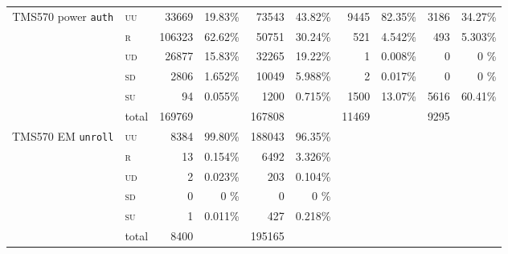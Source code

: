 \documentclass[10pt]{article}
\newcommand{\TI}{TMS570\xspace}
\newcommand{\unroll}{\texttt{unroll}\xspace}
\newcommand{\auth}{\texttt{auth}\xspace}
\newcommand{\UU}{\textsc{uu}\xspace}
\newcommand{\UD}{\textsc{ud}\xspace}
\newcommand{\SU}{\textsc{su}\xspace}
\newcommand{\SD}{\textsc{sd}\xspace}
\newcommand{\R}{\textsc{r}\xspace}
\begin{document}
\begin{table}[H]
\begin{tabular}{ll rr rr rr rr}
    \multicolumn{1}{c}{\multirow{3}{*}{ \parbox{2cm}{\TI power \auth}}}
    & \UU    
    & 33669   & 19.83\%                     
    &  73543  & 43.82\%                 
    &  9445  & 82.35\%                 
    &  3186  & 34.27\%                      
    \\
    & \R   
    & 106323  & 62.62\%                     
    &  50751  & 30.24\%                 
    &  521   & 4.542\%                 
    &  493   & 5.303\%                      
    \\
    & \UD  
    & 26877   & 15.83\%                     
    &  32265  & 19.22\%                 
    &  1     & 0.008\%                 
    &  0     & 0    \%                      
    \\
    & \SD     
    & 2806    & 1.652\%                     
    &  10049  & 5.988\%                 
    &  2     & 0.017\%                 
    &  0     & 0    \%                      
    \\
    & \SU      
    & 94      & 0.055\%                     
    &  1200   & 0.715\%                 
    &  1500  & 13.07\%                 
    &  5616  & 60.41\%                      
    \\

    \cmidrule(l){2-10}
    & total    
    & 169769  &                           
    &  167808 &                       
    &  11469 &                       
    & 9295  &                                 
    \\

    \midrule

    \multicolumn{1}{c}{\multirow{3}{*}{ \parbox{2cm}{\TI EM \unroll}}}

    & \UU    
    & 8384   & 99.80\%                   
    &  188043 & 96.35\%    
    & & 
    & &
    \\
    & \R   
    & 13     & 0.154\%                   
    &  6492   & 3.326\%    
    & & 
    & &
    \\
    & \UD  
    & 2      & 0.023\%                   
    &  203    & 0.104\%    
    & & 
    & &
    \\
    & \SD     
    & 0      & 0    \%                   
    &  0      &  0    \%   
    & & 
    & &
    \\
    & \SU      
    & 1      & 0.011\%                   
    &  427    & 0.218\%    
    & & 
    & &
    \\

    \cmidrule(l){2-10}
    & total    
    & 8400   &                            
    &  195165 &             
    & & 
    & &
    \\   


\end{tabular}
\end{table}
\end{document}
